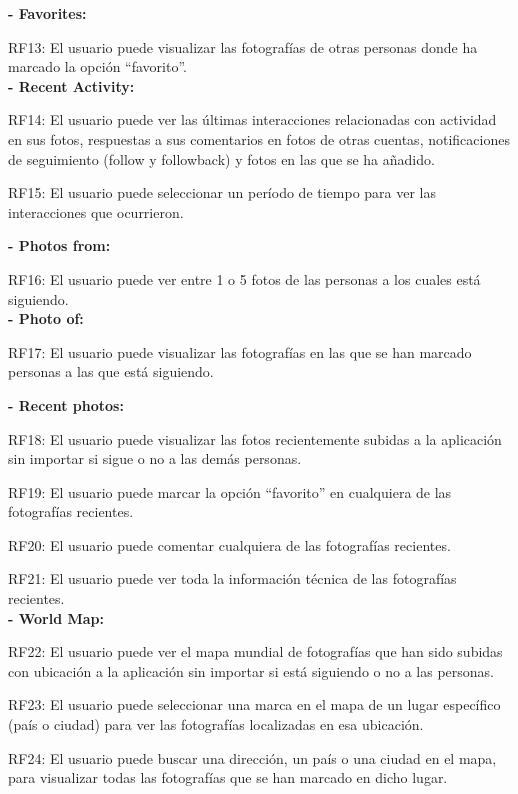 \documentclass{memoria}
\begin{document}
\textbf{- Favorites:}

RF13: El usuario puede visualizar las fotografías de otras personas donde ha marcado la opción “favorito”.\\

\textbf{- Recent Activity:}

RF14: El usuario puede ver las últimas interacciones relacionadas con actividad en sus fotos, respuestas a sus comentarios en fotos de otras cuentas, notificaciones de seguimiento (follow y followback) y fotos en las que se ha añadido.

RF15: El usuario puede seleccionar un período de tiempo para ver las interacciones que ocurrieron.\\


\textbf{- Photos from:} 

RF16: El usuario puede  ver entre 1 o 5 fotos de las personas a los cuales está siguiendo.\\

\textbf{- Photo of:} 

RF17: El usuario puede visualizar las fotografías en las que se han marcado personas a las que está siguiendo.\\


\textbf{- Recent photos:}

RF18: El usuario puede visualizar las fotos recientemente subidas a la aplicación sin importar si sigue o no a las demás personas.

RF19: El usuario puede marcar la opción “favorito” en cualquiera de las fotografías recientes.

RF20: El usuario puede comentar cualquiera de las fotografías recientes.

RF21: El usuario puede ver toda la información técnica de las fotografías recientes.\\

\textbf{- World Map:}

RF22: El usuario puede ver el mapa mundial de fotografías que han sido subidas con ubicación a la aplicación sin importar si está siguiendo o no a las personas.

RF23: El usuario puede seleccionar una marca en el mapa de un lugar específico (país o ciudad) para ver las fotografías localizadas en esa ubicación.

RF24: El usuario puede buscar una dirección, un país o una ciudad  en el mapa, para visualizar todas las fotografías que se han marcado en dicho lugar.\\
\end{document}
